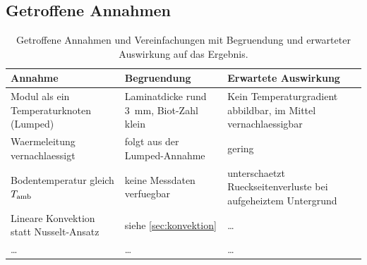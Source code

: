 \subsection{Getroffene Annahmen}
\label{sec:annahmen}


\begin{table}[htbp]
  \centering
  \caption{Getroffene Annahmen und Vereinfachungen mit Begruendung und
           erwarteter Auswirkung auf das Ergebnis.}
  \label{tab:annahmen}
  \begin{tabular}{p{} p{} p{}}
    \toprule
    Annahme & Begruendung & Erwartete Auswirkung \\
    \midrule
    Modul als ein Temperaturknoten (Lumped) &
      Laminatdicke rund \SI{3}{\milli\metre}, Biot-Zahl klein &
      Kein Temperaturgradient abbildbar, im Mittel vernachlaessigbar \\
    Waermeleitung vernachlaessigt &
      folgt aus der Lumped-Annahme &
      gering \\
    Bodentemperatur gleich $T_\mathrm{amb}$ &
      keine Messdaten verfuegbar &
      unterschaetzt Rueckseitenverluste bei aufgeheiztem Untergrund \\
    Lineare Konvektion statt Nusselt-Ansatz &
      siehe \cref{sec:konvektion} &
      \dots \\
    \dots & \dots & \dots \\
    \bottomrule
  \end{tabular}
\end{table}
